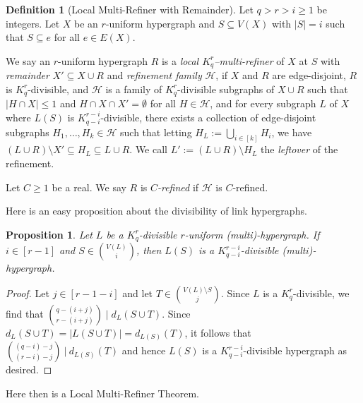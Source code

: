 \documentclass[11pt]{article}
\newcounter{i}
\theoremstyle{plain}
\newtheorem{proposition}[thm]{Proposition}
\theoremstyle{plain} %
\theoremstyle{definition}
\newtheorem{definition}[thm]{Definition}
\begin{document}
\begin{definition}[Local Multi-Refiner with Remainder]\label{def:Local}
Let $q > r > i\ge 1$ be integers. Let $X$ be an $r$-uniform hypergraph and $S\subseteq V(X)$ with $|S|=i$ such that $S\subseteq e$ for all $e\in E(X)$.

We say an $r$-uniform hypergraph $R$ is a \emph{local $K_q^r$--multi-refiner} of $X$ at $S$ with \emph{remainder} $X' \subseteq X\cup R$ and \emph{refinement family} $\mathcal{H}$, if $X$ and $R$ are edge-disjoint, $R$ is $K_q^r$-divisible, and $\mathcal{H}$ is a family of $K_q^r$-divisible subgraphs of $X\cup R$ such that $|H\cap X|\le 1$ and $H\cap X\cap X'=\emptyset$ for all $H\in\mathcal{H}$, and for every subgraph $L$ of $X$ where $L(S)$ is $K_{q-i}^{r-i}$-divisible, there exists a collection of edge-disjoint subgraphs $H_1,\ldots, H_k \in \mathcal{H}$ such that letting $H_L := \bigcup_{i\in [k]} H_i$, we have $(L\cup R)\setminus X' \subseteq H_L \subseteq L\cup R$. We call $L':= (L\cup R) \setminus H_L$ the \emph{leftover} of the refinement. 


Let $C\ge 1$ be a real. We say $R$ is \emph{$C$-refined} if $\mathcal{H}$ is $C$-refined.
\end{definition}

Here is an easy proposition about the divisibility of link hypergraphs.

\begin{proposition}\label{prop:LinkDiv}
Let $L$ be a $K_q^r$-divisible $r$-uniform (multi)-hypergraph. If $i\in [r-1]$ and $S \in \binom{V(L)}{i}$, then $L(S)$ is a $K_{q-i}^{r-i}$-divisible (multi)-hypergraph.   
\end{proposition}
\begin{proof}
Let $j\in [r-1-i]$ and let $T\in \binom{V(L)\setminus S}{j}$. Since $L$ is a $K_q^r$-divisible, we find that $\binom{q-(i+j)}{r-(i+j)}\mid d_L(S\cup T)$. Since $d_L(S\cup T) = |L(S\cup T)| = d_{L(S)}(T)$, it follows that $\binom{(q-i)-j}{(r-i)-j}~|~d_{L(S)}(T)$ and hence $L(S)$ is a $K_{q-i}^{r-i}$-divisible hypergraph as desired.    
\end{proof}



Here then is a Local Multi-Refiner Theorem.
\end{document}
